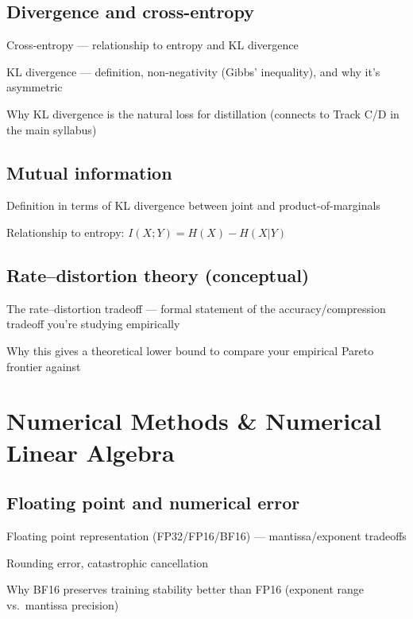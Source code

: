 \subsection{Divergence and cross-entropy}
\begin{tasklist}
    \item Cross-entropy — relationship to entropy and KL divergence
    \item KL divergence — definition, non-negativity (Gibbs' inequality), and why it's asymmetric
    \item Why KL divergence is the natural loss for distillation (connects to Track C/D in the main syllabus)
\end{tasklist}

\subsection{Mutual information}
\begin{tasklist}
    \item Definition in terms of KL divergence between joint and product-of-marginals
    \item Relationship to entropy: $I(X;Y) = H(X) - H(X|Y)$
\end{tasklist}

\subsection{Rate--distortion theory (conceptual)}
\begin{tasklist}
    \item The rate--distortion tradeoff — formal statement of the accuracy/compression tradeoff you're studying empirically
    \item Why this gives a theoretical lower bound to compare your empirical Pareto frontier against
\end{tasklist}

\section{Numerical Methods \& Numerical Linear Algebra}

\subsection{Floating point and numerical error}
\begin{tasklist}
    \item Floating point representation (FP32/FP16/BF16) — mantissa/exponent tradeoffs
    \item Rounding error, catastrophic cancellation
    \item Why BF16 preserves training stability better than FP16 (exponent range vs.\ mantissa precision)
\end{tasklist}

